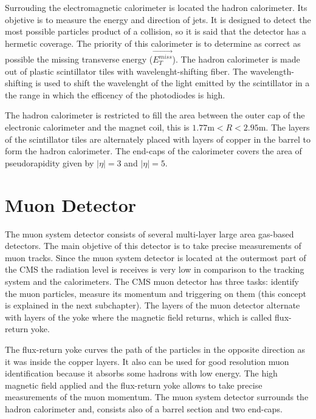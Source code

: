 Surrouding the electromagnetic calorimeter is located the hadron calorimeter. Its objetive is to measure the energy and direction of jets. It is designed to detect the most possible particles product of a collision, so it is said that the detector has a hermetic coverage. The priority of this calorimeter is to determine as correct as possible the missing transverse energy ($\vec{E_T^{miss}}$). The hadron calorimeter is made out of plastic scintillator tiles with wavelenght-shifting fiber. The wavelength-shifting is used to shift the wavelenght of the light emitted by the scintillator in a the range in which the efficency of the photodiodes is high.

The hadron calorimeter is restricted to fill the area between the outer cap of the electronic calorimeter and the magnet coil, this is $1.77 \text{m} < R < 2.95\text{m}$. The layers of the scintillator tiles are alternately placed with layers of copper in the barrel to form the hadron calorimeter. The end-caps of the calorimeter covers the area of pseudorapidity given by $|\eta|= 3$ and $|\eta|= 5$.


\section{Muon Detector}

The muon system detector consists of several multi-layer large area gas-based detectors. The main objetive of this detector is to take precise measurements of muon tracks. Since the muon system detector is located at the outermost part of the CMS the radiation level is receives is very low in comparison to the tracking system and the calorimeters. The CMS muon detector has three tasks: identify the muon particles, measure its momentum and triggering on them (this concept is explained in the next subchapter). The layers of the muon detector alternate with layers of the yoke where the magnetic field returns, which is called flux-return yoke. 

The flux-return yoke curves the path of the particles in the opposite direction as it was inside the copper layers. It also can be used for good resolution muon identification because it absorbs some hadrons with low energy. The high magnetic field applied and the flux-return yoke allows to take precise measurements of the muon momentum. The muon system detector surrounds the hadron  calorimeter and, consists also of a barrel section and two end-caps. 

